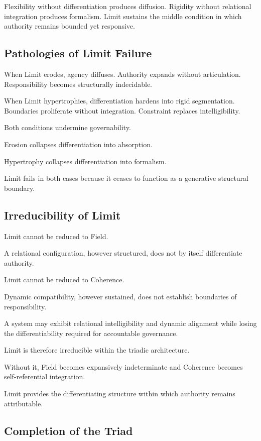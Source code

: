 \documentclass[12pt]{article}
\begin{document}
Flexibility without differentiation produces diffusion. Rigidity without relational integration produces formalism. Limit sustains the middle condition in which authority remains bounded yet responsive.

\subsection{Pathologies of Limit Failure}


When Limit erodes, agency diffuses. Authority expands without articulation. Responsibility becomes structurally indecidable.

When Limit hypertrophies, differentiation hardens into rigid segmentation. Boundaries proliferate without integration. Constraint replaces intelligibility.

Both conditions undermine governability.

Erosion collapses differentiation into absorption.

Hypertrophy collapses differentiation into formalism.

Limit fails in both cases because it ceases to function as a generative structural boundary.

\subsection{Irreducibility of Limit}


Limit cannot be reduced to Field.

A relational configuration, however structured, does not by itself differentiate authority.

Limit cannot be reduced to Coherence.

Dynamic compatibility, however sustained, does not establish boundaries of responsibility.

A system may exhibit relational intelligibility and dynamic alignment while losing the differentiability required for accountable governance.

Limit is therefore irreducible within the triadic architecture.

Without it, Field becomes expansively indeterminate and Coherence becomes self-referential integration.

Limit provides the differentiating structure within which authority remains attributable.

\subsection{Completion of the Triad}
\end{document}
